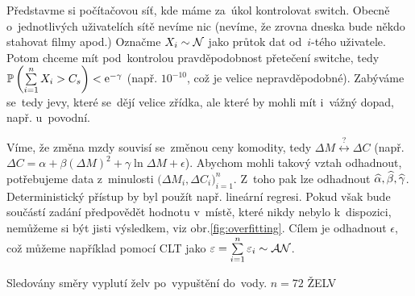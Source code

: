 \begin{example}[MEX] Představme si počítačovou síť, kde máme za~úkol kontrolovat switch. Obecně o~jednotlivých uživatelích sítě nevíme nic (nevíme, že zrovna dneska bude někdo stahovat filmy apod.) Označme $X_i \sim \mathcal{N}$ jako průtok dat od~$i$-tého uživatele. Potom chceme mít pod~kontrolou pravděpodobnost přetečení switche, tedy $\mathbb{P}\left( \sum\limits_{i=1}^{n} X_i>C_s \right)<\mathrm{e}^{-\gamma}$ (např. $10^{-10}$, což je velice nepravděpodobné). Zabýváme se~tedy jevy, které se~dějí velice zřídka, ale které by mohli mít i~vážný dopad, např. u~povodní. 
\end{example}
\begin{example}[Ekonometrie]
	Víme, že změna mzdy souvisí se~změnou ceny komodity, tedy $\Delta M \stackrel{?}{\leftrightarrow}\Delta C$ (např. $\Delta C=\alpha+\beta(\Delta M)^2+\gamma\ln\Delta M+\epsilon$). Abychom mohli takový vztah odhadnout, potřebujeme data z~minulosti $\big(\Delta M_i,\Delta C_i\big)_{i=1}^n$. Z~toho pak lze odhadnout $\widehat{\alpha},\widehat{\beta},\widehat{\gamma}$. Deterministický přístup by byl použít např. lineární regresi. Pokud však bude součástí zadání předpovědět hodnotu v~místě, které nikdy nebylo k~dispozici, nemůžeme si být jisti výsledkem, viz obr.\ref{fig:overfitting}. Cílem je odhadnout $\epsilon$, což můžeme například pomocí CLT jako $\varepsilon=\sum\limits_{i=1}^{n} \varepsilon_i\sim\mathcal{AN}$.
\end{example}


\begin{example}
Sledovány směry vyplutí želv po~vypuštění do~vody.
$ n = 72 $ ŽELV

\end{example}

